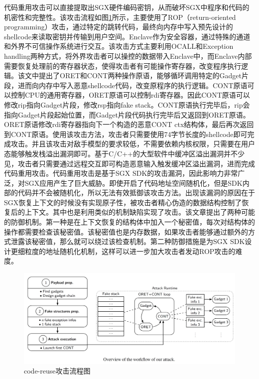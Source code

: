\documentclass[twocolumn]{source/Paper}
\begin{document}
        代码重用攻击\cite{biondo2018guard}可以直接提取出SGX硬件编码密钥，从而破坏SGX中程序和代码的机密性和完整性。该攻击流程如图\ref{codereuse}所示，主要使用了ROP（return-oriented programming）攻击，通过特定的跳转代码，最终向内存中写入预先设计的shellcode来读取密钥并传输到用户空间。Enclave作为安全容器，通过特殊的通道和外界不可信操作系统进行交互。该攻击方式主要利用OCALL和Exception handling两种方式，将外界攻击者可以操控的数据带入Enclave中，而Enclave内部需要恢复处理前的寄存器状态，使得攻击者有可能操作寄存器，改变程序执行逻辑。该文中提出了ORET和CONT两种操作原语，能够循环调用特定的Gadget片段，进而向内存中写入恶意shellcode代码，改变原程序的执行逻辑。CONT原语可以控制CPU的通用寄存器，ORET原语可以控制rdi寄存器。因此CONT原语可以修改rip指向Gadget片段，修改rsp指向fake stack。CONT原语执行完毕后，rip会指向Gadget片段起始位置，而Gadget片段代码执行完毕后又返回到ORET原语。ORET原语修改rdi寄存器指向下一个构造的恶意CONT ctx结构体，最后再次返回到CONT原语。使用该攻击方法，攻击者只需要使用74字节长度的shellcode即可完成攻击。并且该攻击对敌手模型的要求较低，不需要依赖内核权限，只需要在用户态能够触发栈溢出漏洞即可。基于C/C++的大型软件中缓冲区溢出漏洞并不少见，攻击者只需要通过远程交互即可构造恶意输入触发缓冲区溢出漏洞，进而完成代码重用攻击。代码重用攻击是基于SGX SDK的攻击漏洞，因此影响力非常广泛，对SGX应用产生了巨大威胁。即使开启了代码地址空间随机化，但是SDK内部的代码并不会被随机化，所以无法有效抵御该攻击方法。出现该漏洞的原因在于SGX恢复上下文的时候没有实现原子性，被攻击者精心伪造的数据结构控制了恢复后的上下文。其中\cite{cui2021smashex,jang2017hacking}也是利用类似的机制缺陷实现了攻击。该文章提出了两种可能的防御机制。第一种是在上下文恢复的结构体中加入一个秘密值，每次对结构体的操作都需要检查该秘密值。该秘密值也是内存数据，如果攻击者能够通过额外的方式泄露该秘密值，那么就可以绕过该检查机制。第二种防御措施是为SGX SDK设计更细粒度的地址随机化机制，这样可以进一步加大攻击者发动ROP攻击的难度。

        \begin{figure}[H]
            \includegraphics[width=1\linewidth]{pic/attack.jpg}
            \caption{code-reuse攻击流程图}
            \label{codereuse}
        \end{figure}
\end{document}
